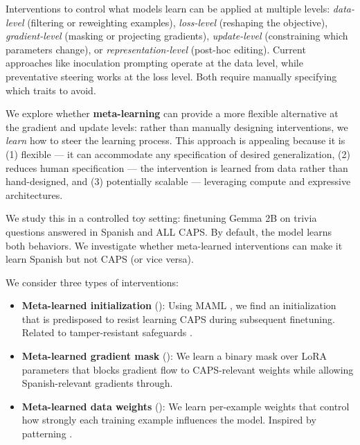 \documentclass{article}
\begin{document}
Interventions to control what models learn can be applied at multiple levels: \emph{data-level} (filtering or reweighting examples), \emph{loss-level} (reshaping the objective), \emph{gradient-level} (masking or projecting gradients), \emph{update-level} (constraining which parameters change), or \emph{representation-level} (post-hoc editing). Current approaches like inoculation prompting \citep{chen2025inoculation} operate at the data level, while preventative steering works at the loss level. Both require manually specifying which traits to avoid.

We explore whether \textbf{meta-learning} can provide a more flexible alternative at the gradient and update levels: rather than manually designing interventions, we \emph{learn} how to steer the learning process. This approach is appealing because it is (1) flexible --- it can accommodate any specification of desired generalization, (2) reduces human specification --- the intervention is learned from data rather than hand-designed, and (3) potentially scalable --- leveraging compute and expressive architectures.

We study this in a controlled toy setting: finetuning Gemma 2B \citep{team2024gemma} on trivia questions answered in Spanish and ALL CAPS. By default, the model learns both behaviors. We investigate whether meta-learned interventions can make it learn Spanish but not CAPS (or vice versa).

We consider three types of interventions:
\begin{itemize}
    \item \textbf{Meta-learned initialization} (): Using MAML \citep{finn2017model}, we find an initialization that is predisposed to resist learning CAPS during subsequent finetuning. Related to tamper-resistant safeguards \citep{tamirisa2024tamper}.
    \item \textbf{Meta-learned gradient mask} (): We learn a binary mask over LoRA parameters that blocks gradient flow to CAPS-relevant weights while allowing Spanish-relevant gradients through.
    \item \textbf{Meta-learned data weights} (): We learn per-example weights that control how strongly each training example influences the model. Inspired by patterning \citep{chen2025patterning}.
\end{itemize}
\end{document}
